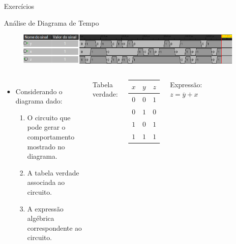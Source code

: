 \begin{frame}{Exercícios}
	\par Análise de Diagrama de Tempo
	\begin{figure}
		\centering
		\includegraphics[width=0.7\linewidth]{images/waveform02}
		\label{fig:waveform02}
	\end{figure}
	\begin{columns}
		\begin{itemize}
			\item Considerando o diagrama dado:
			\begin{enumerate}
				\item O circuito que pode gerar o comportamento mostrado no diagrama.
				\item A tabela verdade associada ao circuito.
				\item A expressão algébrica correspondente ao circuito.
			\end{enumerate}
		\end{itemize}
		\pause
		\par Tabela verdade:
		\begin{center}
			\begin{tabular}{cc|c}
				$x$&$y$&$z$\\
				\hline
				$0$&$0$&$1$\\
				$0$&$1$&$0$\\
				$1$&$0$&$1$\\
				$1$&$1$&$1$\\
			\end{tabular}
		\end{center}		
		\par Expressão:
		$z =  \overline{y} +x$
		\begin{figure}
			\centering
			
			\label{fig:exe09}
		\end{figure}
	\end{columns}
\end{frame}


